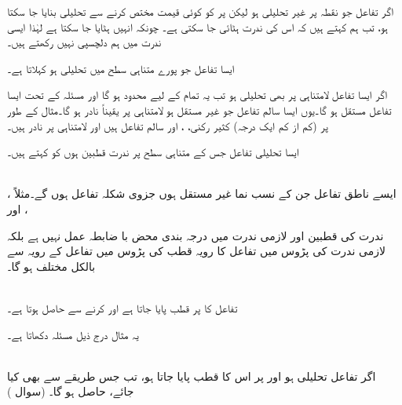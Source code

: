 اگر تفاعل  جو نقطہ  پر غیر تحلیلی ہو لیکن  پر  کو کوئی قیمت مختص کرنے سے تحلیلی بنایا جا سکتا ہو، تب ہم کہتے ہیں کہ اس کی ندرت ہٹائی جا سکتی ہے۔ چونکہ انہیں ہٹایا جا سکتا ہے لہٰذا ایسی ندرت میں ہم دلچسپی نہیں رکھتے ہیں۔

ایسا تفاعل جو پورے متناہی سطح میں تحلیلی ہو  کہلاتا ہے۔

اگر ایسا تفاعل لامتناہی پر بھی تحلیلی ہو تب یہ تمام  کے لیے محدود ہو گا اور مسئلہ  کے تحت ایسا تفاعل مستقل ہو گا۔یوں ایسا سالم تفاعل جو غیر مستقل ہو لامتناہی پر یقیناً  نادر ہو گا۔مثال کے طور پر (کم از کم ایک درجہ) کثیر رکنی، ،  اور  سالم تفاعل ہیں اور لامتناہی پر نادر ہیں۔

ایسا تحلیلی تفاعل جس کے متناہی سطح پر ندرت قطبین ہوں کو  کہتے ہیں۔

\quad {}\\
ایسے ناطق تفاعل جن  کے نسب نما غیر مستقل ہوں جزوی شکلہ تفاعل ہوں گے۔مثلاً ، ،  اور   

ندرت کی قطبین اور لازمی ندرت میں درجہ بندی محض با ضابطہ عمل نہیں ہے بلکہ لازمی ندرت کی پڑوس میں تفاعل کا رویہ قطب کی پڑوس میں تفاعل کے رویہ سے بالکل مختلف ہو گا۔

\quad {}\\
تفاعل  کا  پر قطب پایا جاتا ہے اور  کرنے سے  حاصل ہوتا ہے۔

یہ مثال درج ذیل مسئلہ  دکھاتا ہے۔

\quad {}\\
اگر تفاعل  تحلیلی ہو اور  پر  اس کا قطب  پایا جاتا ہو، تب جس طریقے سے بھی  کیا جائے،  حاصل ہو گا۔ (سوال ) 

